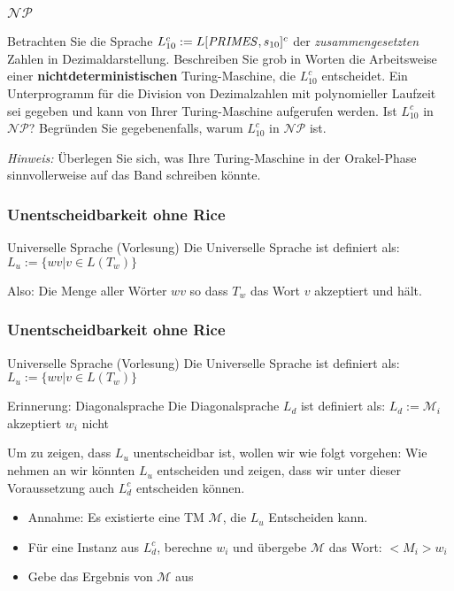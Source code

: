\documentclass{beamer}
\begin{document}
\begin{frame}
\frametitle{$\mathcal{NP}$}
 Betrachten Sie die Sprache $L_{10}^c := L[\text{\textit{PRIMES}},s_{10}]^c$ der \textit{zusammengesetzten} Zahlen in Dezimaldarstellung. 
Beschreiben Sie grob in Worten die Arbeitsweise einer \textbf{nichtdeterministischen} Turing-Maschine, die $L_{10}^c$ entscheidet. 
Ein Unterprogramm für die Division von Dezimalzahlen mit polynomieller Laufzeit sei gegeben und kann von Ihrer Turing-Maschine aufgerufen werden. 
Ist $L_{10}^c$ in $\mathcal{NP}$? Begründen Sie gegebenenfalls, warum $L_{10}^c$ in $\mathcal{NP}$ ist.

\medskip
\textit{Hinweis:} Überlegen Sie sich, was Ihre Turing-Maschine in der Orakel-Phase sinnvollerweise auf das Band schreiben könnte.
\end{frame}


\begin{frame}
\frametitle{Unentscheidbarkeit ohne Rice}
\begin{block}{Universelle Sprache (Vorlesung)}
Die Universelle Sprache ist definiert als: $L_u := \{wv | v \in L(T_w)\}$
\end{block}
Also: Die Menge aller Wörter $wv$ so dass $T_w$ das Wort $v$ akzeptiert und hält.
\end{frame}

\begin{frame}
\frametitle{Unentscheidbarkeit ohne Rice}
\begin{block}{Universelle Sprache (Vorlesung)}
Die Universelle Sprache ist definiert als: $L_u := \{wv | v \in L(T_w)\}$
\end{block}
\begin{block}{Erinnerung: Diagonalsprache}
Die Diagonalsprache $L_d$ ist definiert als: $L_d := \mathcal{M}_i$ akzeptiert $w_i$ nicht
\end{block}
Um zu zeigen, dass $L_u$ unentscheidbar ist, wollen wir wie folgt vorgehen: Wie nehmen an wir könnten $L_u$ entscheiden und zeigen, dass wir unter dieser Voraussetzung auch $L_d^c$ entscheiden können.
\begin{itemize}
\item Annahme: Es existierte eine TM $\mathcal{M}$, die $L_u$ Entscheiden kann.
\item Für eine Instanz aus $L_d^c$, berechne $w_i$ und übergebe $\mathcal{M}$ das Wort: $<M_i>w_i$
\item Gebe das Ergebnis von $\mathcal{M}$ aus
\end{itemize}
\end{frame}
\end{document}

